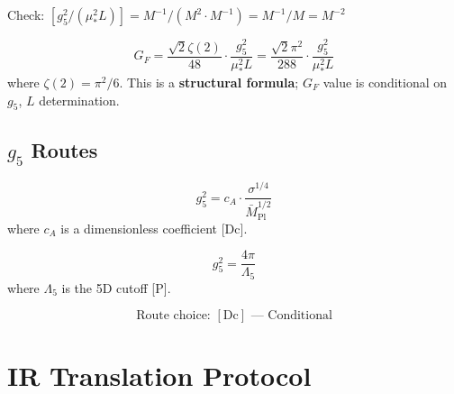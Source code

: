 \documentclass[11pt,a4paper]{article}
\theoremstyle{definition}
\begin{document}
Check: $[g_5^2/(\mu_*^2 L)] = M^{-1}/(M^2 \cdot M^{-1}) = M^{-1}/M = M^{-2}$ \checkmark

\begin{predictionbox}
\begin{equation}
\label{eq:GF_prediction}
G_F = \frac{\sqrt{2} \zeta(2)}{48} \cdot \frac{g_5^2}{\mu_*^2 L} = \frac{\sqrt{2} \pi^2}{288} \cdot \frac{g_5^2}{\mu_*^2 L}
\end{equation}
where $\zeta(2) = \pi^2/6$.
This is a \textbf{structural formula}; $G_F$ value is conditional on $g_5$, $L$ determination.
\end{predictionbox}

\subsection{$g_5$ Routes}
\label{subsec:g5_routes}

\begin{conditionalbox}
\begin{equation}
\label{eq:route_A}
g_5^2 = c_A \cdot \frac{\sigma^{1/4}}{\bar{M}_{\text{Pl}}^{1/2}}
\end{equation}
where $c_A$ is a dimensionless coefficient [Dc].
\end{conditionalbox}

\begin{conditionalbox}
\begin{equation}
\label{eq:route_C}
g_5^2 = \frac{4\pi}{\Lambda_5}
\end{equation}
where $\Lambda_5$ is the 5D cutoff [P].
\end{conditionalbox}

\begin{equation}
\label{eq:route_status}
\text{Route choice: } [\text{Dc}] \text{ --- Conditional}
\end{equation}

\section{IR Translation Protocol}
\label{sec:ir_translation}
\end{document}
